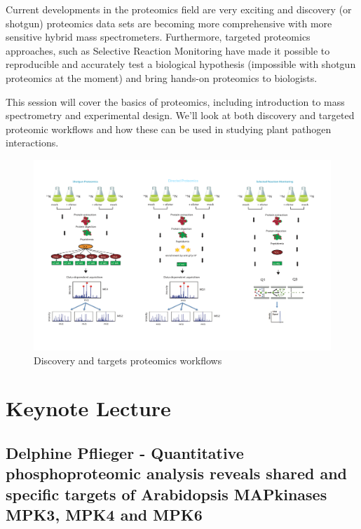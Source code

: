 \documentclass[12pt,]{book}
\theoremstyle{definition}
\theoremstyle{definition}
\theoremstyle{remark}
\begin{document}
Current developments in the proteomics field are very exciting and
discovery (or shotgun) proteomics data sets are becoming more
comprehensive with more sensitive hybrid mass spectrometers.
Furthermore, targeted proteomics approaches, such as Selective Reaction
Monitoring \citep{Picotti:2013jp} have made it possible to reproducible
and accurately test a biological hypothesis (impossible with shotgun
proteomics at the moment) and bring hands-on proteomics to biologists.

This session will cover the basics of proteomics, including introduction
to mass spectrometry and experimental design. We'll look at both
discovery and targeted proteomic workflows and how these can be used in
studying plant pathogen interactions.

\begin{figure}
\includegraphics[width=5.97in]{assets/prot1} \caption{Discovery and targets proteomics workflows}\label{fig:mainp}
\end{figure}

\section*{Keynote Lecture}\label{keynote-lecture-6}

\subsection*{Delphine Pflieger - Quantitative phosphoproteomic analysis
reveals shared and specific targets of Arabidopsis MAPkinases MPK3, MPK4
and
MPK6}\label{delphine-pflieger---quantitative-phosphoproteomic-analysis-reveals-shared-and-specific-targets-of-arabidopsis-mapkinases-mpk3-mpk4-and-mpk6}
\end{document}
